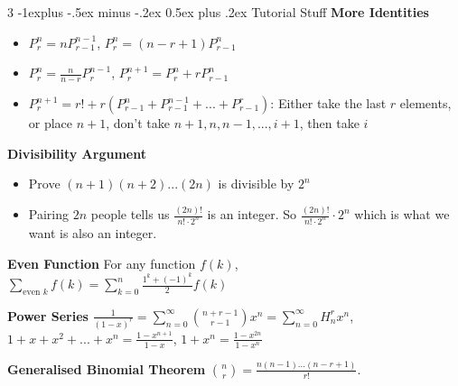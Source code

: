 \documentclass[10pt, landscape]{article}
\makeatletter
\renewcommand{\section}{\@startsection{section}{1}{0mm}%
                                {-1ex plus -.5ex minus -.2ex}%
                                {0.5ex plus .2ex}%
                                {\normalfont\large\bfseries}}
\renewcommand{\section}{\@startsection{section}{2}{0mm}%
                                {-1explus -.5ex minus -.2ex}%
                                {0.5ex plus .2ex}%
                                {\normalfont\normalsize\bfseries}}
\renewcommand{\subsection}{\@startsection{subsection}{3}{0mm}%
                                {-1ex plus -.5ex minus -.2ex}%
                                {1ex plus .2ex}%
                                {\normalfont\small\bfseries}}%
\makeatother
\begin{document}
\begin{multicols*}{3}
\section{Tutorial Stuff}
\textbf{More Identities}
\begin{itemize}
    \item $P_r^n=nP_{r-1}^{n-1}$, $P_r^n=(n-r+1)P_{r-1}^n$
    \item $P_r^n=\frac{n}{n-r}P_r^{n-1}$, $P_r^{n+1}=P_r^n+rP_{r-1}^n$
    \item $P_r^{n+1}=r!+r(P_{r-1}^n+P_{r-1}^{n-1}+...+P_{r-1}^r)$: Either take the last $r$ elements, or place $n+1$, don't take $n+1,n,n-1,...,i+1$, then take $i$
\end{itemize}

\textbf{Divisibility Argument}
\begin{itemize}
    \item Prove $(n+1)(n+2)...(2n)$ is divisible by $2^n$
    \item Pairing $2n$ people tells us $\frac{(2n)!}{n!\cdot2^n}$ is an integer. So $\frac{(2n)!}{n!\cdot2^n} \cdot 2^n$ which is what we want is also an integer.
\end{itemize}

\textbf{Even Function} For any function $f(k)$, $\sum_{\text{even } k} f(k)=\sum_{k=0}^n\frac{1^k+(-1)^k}{2}f(k)$

\textbf{Power Series} $\frac{1}{(1-x)^r}=\sum_{n=0}^\infty {n+r-1 \choose r-1}x^n=\sum_{n=0}^\infty H^r_nx^n$, $1+x+x^2+...+x^n=\frac{1-x^{n+1}}{1-x}$, $1+x^n=\frac{1-x^{2n}}{1-x^n}$

\textbf{Generalised Binomial Theorem} ${n \choose r} = \frac{n(n-1)...(n-r+1)}{r!}$.







\end{multicols*}
\end{document}
